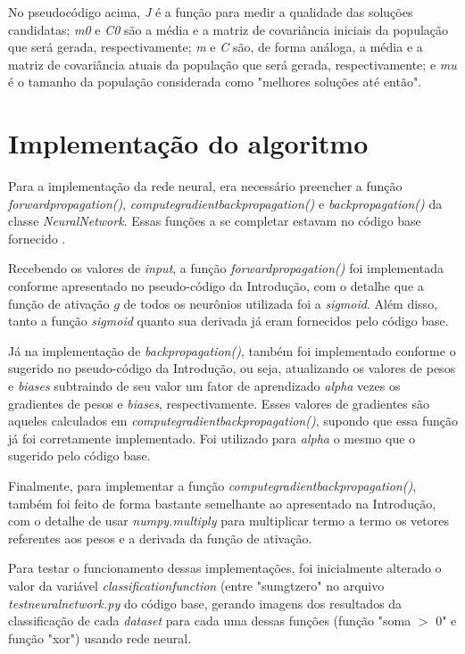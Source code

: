 \documentclass[conference]{IEEEtran}
\begin{document}
No pseudocódigo acima, \textit{J} é a função para medir a qualidade das soluções candidatas; \textit{m0} e \textit{C0} são a média e a matriz de covariância iniciais da população que será gerada, respectivamente; \textit{m} e \textit{C} são, de forma análoga, a média e a matriz de covariância atuais da população que será gerada, respectivamente; e \textit{mu} é o tamanho da população considerada como "melhores soluções até então".

\section{Implementação do algoritmo}
Para a implementação da rede neural, era necessário preencher a função \textit{forward\underline{\space}propagation()}, \textit{compute\underline{\space}gradient\underline{\space}back\underline{\space}propagation()} e \textit{back\underline{\space}propagation()} da classe \textit{NeuralNetwork}. Essas funções a se completar estavam no código base fornecido \cite{roteiro}.  

Recebendo os valores de \textit{input}, a função \textit{forward\underline{\space}propagation()} foi implementada conforme apresentado no pseudo-código da Introdução, com o detalhe que a função de ativação $g$ de todos os neurônios utilizada foi a \textit{sigmoid}. Além disso, tanto a função \textit{sigmoid} quanto sua derivada já eram fornecidos pelo código base. 

Já na implementação de \textit{back\underline{\space}propagation()}, também foi implementado conforme o sugerido no pseudo-código da Introdução, ou seja, atualizando os valores de pesos e \textit{biases} subtraindo de seu valor um fator de aprendizado \textit{alpha} vezes os gradientes de pesos e \textit{biases}, respectivamente. Esses valores de gradientes são aqueles calculados em \textit{compute\underline{\space}gradient\underline{\space}back\underline{\space}propagation()}, supondo que essa função já foi corretamente implementado. Foi utilizado para \textit{alpha} o mesmo que o sugerido pelo código base. 

Finalmente, para implementar a função \textit{compute\underline{\space}gradient\underline{\space}back\underline{\space}propagation()}, também foi feito de forma bastante semelhante ao apresentado na Introdução, com o detalhe de usar \textit{numpy.multiply} para multiplicar termo a termo os vetores referentes aos pesos e a derivada da função de ativação.

Para testar o funcionamento dessas implementações, foi inicialmente alterado o valor da variável \textit{classification\underline{\space}function} (entre "sum\underline{\space}gt\underline{\space}zero" no arquivo \textit{test\underline{\space}neural\underline{\space}network.py} do código base, gerando imagens dos resultados da classificação de cada \textit{dataset} para cada uma dessas funções (função "soma $>$ 0" e função "xor") usando rede neural.
\end{document}
